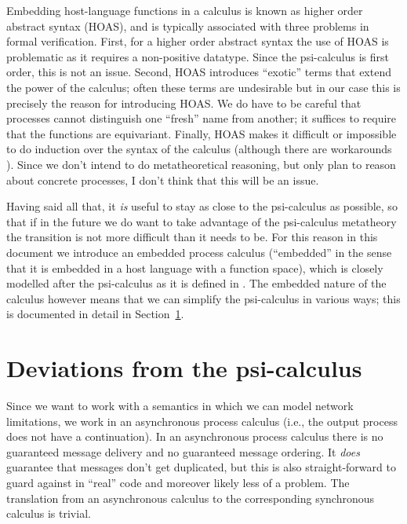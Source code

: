 \documentclass{article}
\newcommand{\psicalculus}{psi-calculus\xspace}
\begin{document}
Embedding host-language functions in a calculus is known as higher order
abstract syntax (HOAS), and is typically associated with three problems in
formal verification. First, for a higher order abstract syntax the use of HOAS
is problematic as it requires a non-positive datatype. Since the psi-calculus is
first order, this is not an issue. Second, HOAS introduces ``exotic'' terms that
extend the power of the calculus; often these terms are undesirable but in our
case this is precisely the reason for introducing HOAS. We do have to be careful
that processes cannot distinguish one ``fresh'' name from another; it suffices
to require that the functions are equivariant. Finally, HOAS makes it difficult
or impossible to do induction over the syntax of the calculus (although there
are workarounds \cite{Röckl2001}). Since we don't intend to do metatheoretical
reasoning, but only plan to reason about concrete processes, I don't think that
this will be an issue.

Having said all that, it \emph{is} useful to stay as close to the \psicalculus
as possible, so that if in the future we do want to take advantage of the
\psicalculus metatheory the transition is not more difficult than it needs to
be. For this reason in this document we introduce an embedded process calculus
(``embedded'' in the sense that it is embedded in a host language with a
function space), which is closely modelled after the \psicalculus as it is
defined in \cite{Borgström2015}. The embedded nature of the calculus however
means that we can simplify the \psicalculus in various ways; this is documented
in detail in Section~\ref{sec:deviations}.

\section{Deviations from the \psicalculus}
\label{sec:deviations}

Since we want to work with a semantics in which we can model network
limitations, we work in an asynchronous process calculus (i.e., the output
process does not have a continuation). In an asynchronous process calculus there
is no guaranteed message delivery and no guaranteed message ordering. It
\emph{does} guarantee that messages don't get duplicated, but this is also
straight-forward to guard against in ``real'' code and moreover likely less
of a problem. The translation from an asynchronous calculus to the corresponding
synchronous calculus is trivial.
\end{document}
